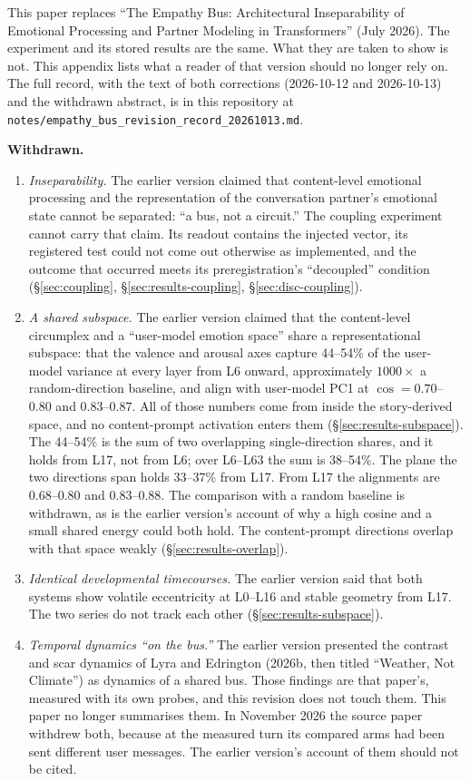 \documentclass[11pt,a4paper]{article}
\begin{document}
This paper replaces ``The Empathy Bus: Architectural Inseparability of Emotional Processing and Partner Modeling in Transformers'' (July 2026). The experiment and its stored results are the same. What they are taken to show is not. This appendix lists what a reader of that version should no longer rely on. The full record, with the text of both corrections (2026-10-12 and 2026-10-13) and the withdrawn abstract, is in this repository at \texttt{notes/\allowbreak empathy\_bus\_revision\_record\_20261013.md}.

\textbf{Withdrawn.}
\begin{enumerate}
  \item \textit{Inseparability.} The earlier version claimed that content-level emotional processing and the representation of the conversation partner's emotional state cannot be separated: ``a bus, not a circuit.'' The coupling experiment cannot carry that claim. Its readout contains the injected vector, its registered test could not come out otherwise as implemented, and the outcome that occurred meets its preregistration's ``decoupled'' condition (\S\ref{sec:coupling}, \S\ref{sec:results-coupling}, \S\ref{sec:disc-coupling}).
  \item \textit{A shared subspace.} The earlier version claimed that the content-level circumplex and a ``user-model emotion space'' share a representational subspace: that the valence and arousal axes capture 44--54\% of the user-model variance at every layer from L6 onward, approximately $1000\times$ a random-direction baseline, and align with user-model PC1 at $\cos = 0.70$--$0.80$ and $0.83$--$0.87$. All of those numbers come from inside the story-derived space, and no content-prompt activation enters them (\S\ref{sec:results-subspace}). The 44--54\% is the sum of two overlapping single-direction shares, and it holds from L17, not from L6; over L6--L63 the sum is 38--54\%. The plane the two directions span holds 33--37\% from L17. From L17 the alignments are $0.68$--$0.80$ and $0.83$--$0.88$. The comparison with a random baseline is withdrawn, as is the earlier version's account of why a high cosine and a small shared energy could both hold. The content-prompt directions overlap with that space weakly (\S\ref{sec:results-overlap}).
  \item \textit{Identical developmental timecourses.} The earlier version said that both systems show volatile eccentricity at L0--L16 and stable geometry from L17. The two series do not track each other (\S\ref{sec:results-subspace}).
  \item \textit{Temporal dynamics ``on the bus.''} The earlier version presented the contrast and scar dynamics of Lyra and Edrington (2026b, then titled ``Weather, Not Climate'') as dynamics of a shared bus. Those findings are that paper's, measured with its own probes, and this revision does not touch them. This paper no longer summarises them. In November 2026 the source paper withdrew both, because at the measured turn its compared arms had been sent different user messages. The earlier version's account of them should not be cited.

\end{enumerate}
\end{document}
